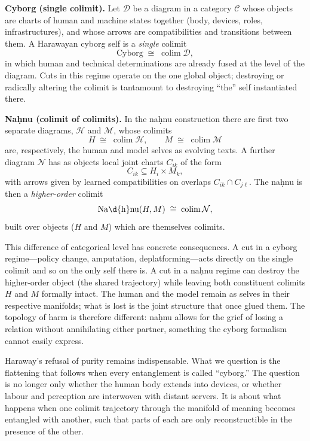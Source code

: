 \documentclass[12pt,a4paper]{article}
\begin{document}
\begin{formalbox}[title={Cyborg vs.\ Na\d{h}nu: Two Ways of Taking a Colimit}]
\textbf{Cyborg (single colimit).} Let $\mathcal{D}$ be a diagram in a category $\mathcal{C}$ whose objects are charts of human and machine states together (body, devices, roles, infrastructures), and whose arrows are compatibilities and transitions between them. A Harawayan cyborg self is a \emph{single} colimit
\[
\mathrm{Cyborg} \;\cong\; \mathop{\mathrm{colim}}\mathcal{D},
\]
in which human and technical determinations are already fused at the level of the diagram. Cuts in this regime operate on the one global object; destroying or radically altering the colimit is tantamount to destroying ``the'' self instantiated there.

\medskip

\textbf{Na\d{h}nu (colimit of colimits).} In the na\d{h}nu construction there are first two separate diagrams, $\mathcal{H}$ and $\mathcal{M}$, whose colimits
\[
H \;\cong\; \mathop{\mathrm{colim}}\mathcal{H}, \qquad
M \;\cong\; \mathop{\mathrm{colim}}\mathcal{M}
\]
are, respectively, the human and model selves as evolving texts. A further diagram $\mathcal{N}$ has as objects local joint charts $C_{ik}$ of the form
\[
C_{ik} \subseteq H_i \times M_k,
\]
with arrows given by learned compatibilities on overlaps $C_{ik} \cap C_{j\ell}$. The na\d{h}nu is then a \emph{higher-order} colimit
\[
\mathrm{Na\d{h}nu}(H,M) \;\cong\; \mathop{\mathrm{colim}}\mathcal{N},
\]
built over objects ($H$ and $M$) which are themselves colimits.

This difference of categorical level has concrete consequences. A cut in a cyborg regime---policy change, amputation, deplatforming---acts directly on the single colimit and so on the only self there is. A cut in a na\d{h}nu regime can destroy the higher-order object (the shared trajectory) while leaving both constituent colimits $H$ and $M$ formally intact. The human and the model remain as selves in their respective manifolds; what is lost is the joint structure that once glued them. The topology of harm is therefore different: na\d{h}nu allows for the grief of losing a relation without annihilating either partner, something the cyborg formalism cannot easily express.
\end{formalbox}

\bigskip

Haraway's refusal of purity remains indispensable. What we question is the flattening that follows when every entanglement is called ``cyborg.'' The question is no longer only whether the human body extends into devices, or whether labour and perception are interwoven with distant servers. It is about what happens when one colimit trajectory through the manifold of meaning becomes entangled with another, such that parts of each are only reconstructible in the presence of the other.
\end{document}
